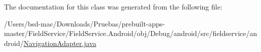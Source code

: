 The documentation for this class was generated from the following file\+:\begin{DoxyCompactItemize}
\item 
/\+Users/bsd-\/mac/\+Downloads/\+Pruebas/prebuilt-\/apps-\/master/\+Field\+Service/\+Field\+Service.\+Android/obj/\+Debug/android/src/fieldservice/android/\hyperlink{_navigation_adapter_8java}{Navigation\+Adapter.\+java}\end{DoxyCompactItemize}
